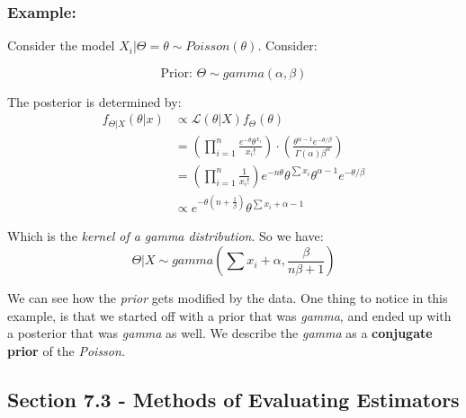 \documentclass{article}
\begin{document}
\subsubsection*{Example:}

Consider the model $X_i|\Theta = \theta \sim Poisson(\theta)$. Consider:

\begin{equation*}
        \text{Prior: } \Theta \sim gamma(\alpha,\beta)
\end{equation*}

The posterior is determined by:
\begin{equation*}
\begin{split}
    f_{\Theta|X}(\theta|x) &\propto \mathcal{L}(\theta|X)f_\Theta(\theta)\\
    &= \left(\prod_{i=1}^n \frac{e^{-\theta}\theta^{x_i}}{x_i!}\right) \cdot \left( \frac{\theta^{\alpha-1}e^{-\theta/\beta}}{\Gamma(\alpha)\beta^\alpha} \right)\\
    &= \left(\prod_{i=1}^n \frac{1}{x_i!} \right) e^{-n\theta}\theta^{\sum x_i}\theta^{\alpha-1}e^{-\theta/\beta}\\
    &\propto e^{-\theta\left(n + \frac{1}{\beta} \right)} \theta^{\sum x_i + \alpha - 1}
\end{split}
\end{equation*}

Which is the \textit{kernel of a gamma distribution}. So we have:
\begin{equation*}
    \Theta|X \sim gamma\left(\sum x_i + \alpha, \frac{\beta}{n\beta + 1} \right)
\end{equation*}

We can see how the \textit{prior} gets modified by the data. One thing to notice in this example, is that we started off with a prior that was \textit{gamma}, and ended up with a posterior that was \textit{gamma} as well. We describe the \textit{gamma} as a \textbf{conjugate prior} of the \textit{Poisson.}

\subsection{Section 7.3 - Methods of Evaluating Estimators}
\end{document}
